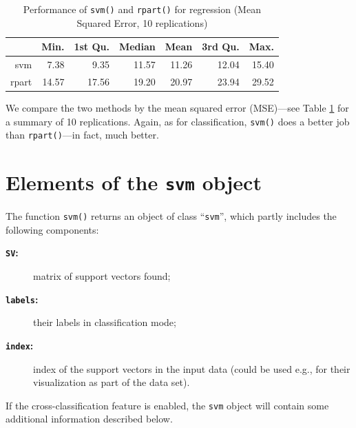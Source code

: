 \documentclass[a4paper]{article}
\begin{document}
\begin{Schunk}
\begin{table}
\begin{center}
\begin{tabular}{rrrrrrr}
\hline
 & Min. & 1st Qu. & Median & Mean & 3rd Qu. & Max. \\
\hline
svm & 7.38 & 9.35 & 11.57 & 11.26 & 12.04 & 15.40 \\
rpart & 14.57 & 17.56 & 19.20 & 20.97 & 23.94 & 29.52 \\
\hline
\end{tabular}
\caption{Performance of \texttt{svm()} and
       \texttt{rpart()} for regression (Mean Squared Error, 10 replications)}
\label{tab:reg}
\end{center}
\end{table}\end{Schunk}

\noindent We compare the two methods by the mean squared error (MSE)---see Table
\ref{tab:reg} for a summary of 10 replications. 
Again, as for classification, \texttt{svm()}
does a better job than \texttt{rpart()}---in fact, much better.

\section*{Elements of the \texttt{svm} object}

The function \texttt{svm()} returns an object of class ``\texttt{svm}'',
which partly includes the following components:

\begin{description}
 \item[\textbf{\texttt{SV}:}] matrix of support vectors found;
 \item[\textbf{\texttt{labels}:}] their labels in classification mode;
 \item[\textbf{\texttt{index}:}] index of the support vectors in the input data (could
  be used e.g., for their visualization as part of the data set).
\end{description}
If the cross-classification feature is enabled, the
\texttt{svm} object will contain some additional information described below.
\end{document}
